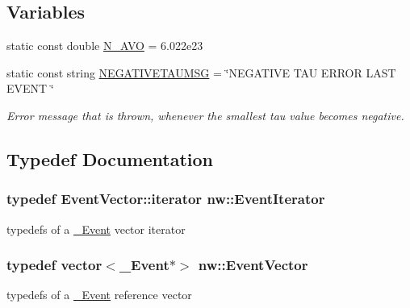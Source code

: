 \subsection*{Variables}
\begin{DoxyCompactItemize}
\item 
static const double \hyperlink{namespacenw_ad890cfa7dd9eaf8d5b6754723e516c4a}{N\+\_\+\+A\+V\+O} = 6.\+022e23
\item 
static const string \hyperlink{namespacenw_a7d9622d3fd42f8d91bb8b8a79688518d}{N\+E\+G\+A\+T\+I\+V\+E\+T\+A\+U\+M\+S\+G} = \char`\"{}N\+E\+G\+A\+T\+I\+V\+E T\+A\+U E\+R\+R\+O\+R L\+A\+S\+T E\+V\+E\+N\+T \char`\"{}
\begin{DoxyCompactList}\small\item\em Error message that is thrown, whenever the smallest tau value becomes negative. \end{DoxyCompactList}\end{DoxyCompactItemize}


\subsection{Typedef Documentation}
\hypertarget{namespacenw_a543a4f72e609ca94582c1c7c10303e0b}{
\subsubsection[{Event\+Iterator}]{\setlength{\rightskip}{0pt plus 5cm}typedef Event\+Vector\+::iterator {\bf nw\+::\+Event\+Iterator}}}\label{namespacenw_a543a4f72e609ca94582c1c7c10303e0b}


typedefs of a \hyperlink{classnw_1_1___event}{\+\_\+\+Event} vector iterator 

\hypertarget{namespacenw_a0d9ea27d7802637354c7892806eac1fc}{
\subsubsection[{Event\+Vector}]{\setlength{\rightskip}{0pt plus 5cm}typedef vector$<${\bf \+\_\+\+Event}$\ast$$>$ {\bf nw\+::\+Event\+Vector}}}\label{namespacenw_a0d9ea27d7802637354c7892806eac1fc}


typedefs of a \hyperlink{classnw_1_1___event}{\+\_\+\+Event} reference vector 

